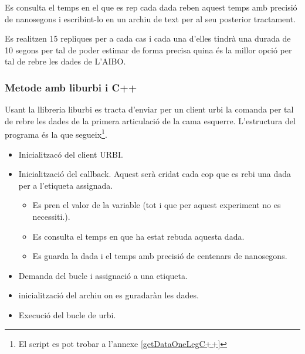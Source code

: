\documentclass[12pt,a4paper,final,twoside]{article}
\begin{document}
Es consulta el temps en el que es rep cada dada reben aquest temps amb precisió de nanosegons i escribint-lo   en un archiu de text per al seu posterior tractament.

Es realitzen 15 repliques per a cada cas i cada una d'elles tindrà una durada de 10 segons per tal de poder estimar de forma precisa quina és la millor opció per tal de rebre les dades de L'AIBO.

\subsubsection{Metode amb liburbi i C++}

Usant la llibreria liburbi es tracta d'enviar per un client urbi la comanda per tal de rebre les dades de la primera articulació de la cama esquerre. 
L'estructura del programa és la que segueix\footnote{El script es pot trobar a l'annexe \ref{getDataOneLegC++}}.
\begin{itemize}
\item Inicialitzacó del client URBI.
\item Inicialització del callback. 
Aquest serà cridat cada cop que es rebi una dada per a l'etiqueta assignada.
\begin{itemize}
\item Es pren el valor de la variable (tot i que per aquest experiment no es necessiti.).
\item Es consulta el temps en que ha estat rebuda aquesta dada.
\item Es guarda la dada i el temps amb precisió de centenars de nanosegons.
\end{itemize}
\item Demanda del bucle i assignació a una etiqueta.
\item inicialització del archiu on es guradaràn les dades.
\item  Execució del bucle de urbi. 
\end{itemize}



\end{document}
